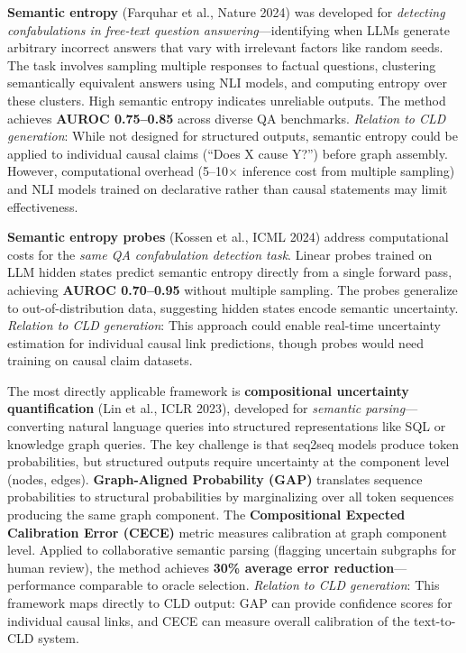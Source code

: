 \textbf{Semantic entropy} (Farquhar et al., Nature 2024) was developed for \textit{detecting confabulations in free-text question answering}---identifying when LLMs generate arbitrary incorrect answers that vary with irrelevant factors like random seeds. The task involves sampling multiple responses to factual questions, clustering semantically equivalent answers using NLI models, and computing entropy over these clusters. High semantic entropy indicates unreliable outputs. The method achieves \textbf{AUROC 0.75--0.85} across diverse QA benchmarks. \textit{Relation to CLD generation}: While not designed for structured outputs, semantic entropy could be applied to individual causal claims (``Does X cause Y?'') before graph assembly. However, computational overhead (5--10$\times$ inference cost from multiple sampling) and NLI models trained on declarative rather than causal statements may limit effectiveness.

\textbf{Semantic entropy probes} (Kossen et al., ICML 2024) address computational costs for the \textit{same QA confabulation detection task}. Linear probes trained on LLM hidden states predict semantic entropy directly from a single forward pass, achieving \textbf{AUROC 0.70--0.95} without multiple sampling. The probes generalize to out-of-distribution data, suggesting hidden states encode semantic uncertainty. \textit{Relation to CLD generation}: This approach could enable real-time uncertainty estimation for individual causal link predictions, though probes would need training on causal claim datasets.

The most directly applicable framework is \textbf{compositional uncertainty quantification} (Lin et al., ICLR 2023), developed for \textit{semantic parsing}---converting natural language queries into structured representations like SQL or knowledge graph queries. The key challenge is that seq2seq models produce token probabilities, but structured outputs require uncertainty at the component level (nodes, edges). \textbf{Graph-Aligned Probability (GAP)} translates sequence probabilities to structural probabilities by marginalizing over all token sequences producing the same graph component. The \textbf{Compositional Expected Calibration Error (CECE)} metric measures calibration at graph component level. Applied to collaborative semantic parsing (flagging uncertain subgraphs for human review), the method achieves \textbf{30\% average error reduction}---performance comparable to oracle selection. \textit{Relation to CLD generation}: This framework maps directly to CLD output: GAP can provide confidence scores for individual causal links, and CECE can measure overall calibration of the text-to-CLD system.


